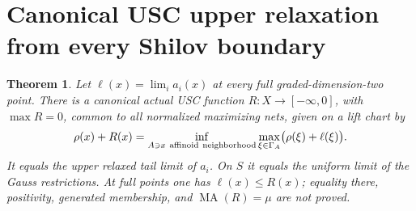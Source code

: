 \documentclass[11pt]{article}
\newtheorem{theorem}{Theorem}
\newcommand{\MA}{\operatorname{MA}}
\begin{document}
\section{Canonical USC upper relaxation from every Shilov boundary}
\begin{theorem}\label{relax}
Let $\ell(x)=\lim_i a_i(x)$ at every full graded-dimension-two point.
There is a canonical actual USC function $R:X\to[-\infty,0]$, with
$\max R=0$, common to all normalized maximizing nets, given on a lift chart by
\begin{equation}\label{shilovrelax}
 \rho(x)+R(x)=\inf_{A\ni x\ {\rm affinoid\ neighborhood}}
       \max_{\xi\in\Gamma_A}\bigl(\rho(\xi)+\ell(\xi)\bigr).
\end{equation}
It equals the upper relaxed tail limit of $a_i$. On $S$ it equals the
uniform limit of the Gauss restrictions. At full points one has
$\ell(x)\le R(x)$; equality there, positivity, generated membership,
and $\MA(R)=\mu$ are not proved.
\end{theorem}
\end{document}
